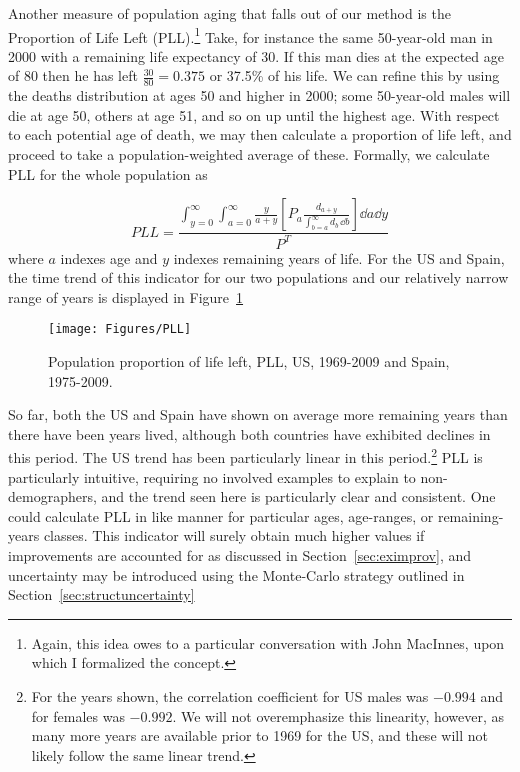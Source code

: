 Another measure of population aging that falls out of our method is the
Proportion of Life Left (PLL).\footnote{Again, this idea owes to a
particular conversation with John MacInnes, upon which I formalized the
concept.} Take, for instance the same 50-year-old man in 2000 with a remaining life expectancy of
30. If this man dies at the expected age of 80 then he has left $\tfrac{30}{80}
= 0.375$ or 37.5\% of his life. We can refine this by using the deaths 
distribution at ages 50 and higher in 2000; some 50-year-old
males will die at age 50, others at age 51, and so on up until the highest age.
With respect to each potential age of death, we may then calculate a proportion
of life left, and proceed to take a population-weighted average of these.
Formally, we calculate PLL for the whole population as

\begin{equation}
PLL = \frac{\int _{y = 0} ^\infty \int _{a = 0} ^\infty \frac{y}{a + y}
\left[ P_a
\frac{d_{a + y} }{ \int _{b = a} ^{\infty} d_b\, \dd b  }\right] \dd a \dd y }{
P^T }
\end{equation}
where $a$ indexes age and $y$ indexes remaining years of life. For the US and
Spain, the time trend of this indicator for our two populations and our
relatively narrow range of years is displayed in Figure~\ref{fig:PLL}
\begin{figure}
      \centering
      \caption{Population proportion of life left, PLL, US, 1969-2009 and
      Spain, 1975-2009.}
         \texttt{[image: Figures/PLL]}
      \label{fig:PLL} 
\end{figure}

So far, both the US and Spain have shown on average more remaining years than
there have been years lived, although both countries have exhibited declines in
this period. The US trend has been particularly linear in this
period.\footnote{For the years shown, the correlation coefficient for US males
was $-0.994$ and for females was $-0.992$. We will not overemphasize this
linearity, however, as many more years are available prior to 1969 for the US,
and these will not likely follow the same linear trend.} PLL is particularly
intuitive, requiring no involved examples to explain to non-demographers, 
and the trend seen here is particularly clear and consistent. One could 
calculate PLL in like manner for particular ages, age-ranges, or remaining-years 
classes. This indicator will surely obtain much higher values if improvements
 are accounted for as discussed in Section~\ref{sec:eximprov}, and uncertainty 
 may be introduced using the Monte-Carlo strategy outlined in Section~\ref{sec:structuncertainty}

